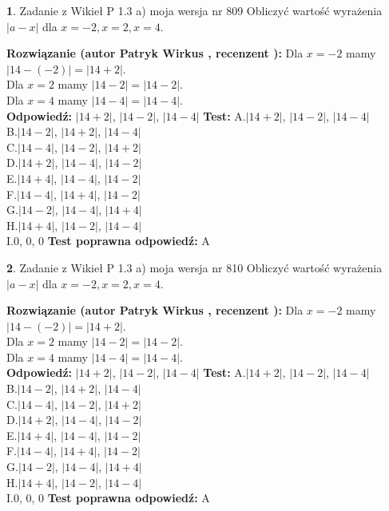 \documentclass[12pt, a4paper]{article}
\theoremstyle{definition} %
\newtheorem{zad}{}
\newcommand{\zadStart}[1]{\begin{zad}#1\newline}
\newcommand{\zadStop}{\end{zad}}
\newcommand{\rozwStart}[2]{\noindent \textbf{Rozwiązanie (autor #1 , recenzent #2): }\newline}
\newcommand{\rozwStop}{\newline}
\newcommand{\odpStart}{\noindent \textbf{Odpowiedź:}\newline}
\newcommand{\odpStop}{\newline}
\newcommand{\testStart}{\noindent \textbf{Test:}\newline}
\newcommand{\testStop}{\newline}
\newcommand{\kluczStart}{\noindent \textbf{Test poprawna odpowiedź:}\newline}
\newcommand{\kluczStop}{\newline}
\begin{document}
\zadStart{Zadanie z Wikieł P 1.3 a) moja wersja nr 809}
Obliczyć wartość wyrażenia $|a - x|$ dla $x=-2,x=2,x=4$.
\zadStop
\rozwStart{Patryk Wirkus}{}
Dla $x = -2$ mamy $|14 - (-2)| = |14 + 2|$.\\
Dla $x = 2$ mamy $|14 - 2| = |14 - 2|$.\\
Dla $x = 4$ mamy $|14 - 4| = |14 - 4|$.\\
\rozwStop
\odpStart
$|14 + 2|$, $|14 - 2|$, $|14 - 4|$
\odpStop
\testStart
A.$|14 + 2|$, $|14 - 2|$, $|14 - 4|$\\
B.$|14 - 2|$, $|14 + 2|$, $|14 - 4|$\\
C.$|14 - 4|$, $|14 - 2|$, $|14 + 2|$\\
D.$|14 + 2|$, $|14 - 4|$, $|14 - 2|$\\
E.$|14 + 4|$, $|14 - 4|$, $|14 - 2|$\\
F.$|14 - 4|$, $|14 + 4|$, $|14 - 2|$\\
G.$|14 - 2|$, $|14 - 4|$, $|14 + 4|$\\
H.$|14 + 4|$, $|14 - 2|$, $|14 - 4|$\\
I.$0$, $0$, $0$
\testStop
\kluczStart
A
\kluczStop



\zadStart{Zadanie z Wikieł P 1.3 a) moja wersja nr 810}
Obliczyć wartość wyrażenia $|a - x|$ dla $x=-2,x=2,x=4$.
\zadStop
\rozwStart{Patryk Wirkus}{}
Dla $x = -2$ mamy $|14 - (-2)| = |14 + 2|$.\\
Dla $x = 2$ mamy $|14 - 2| = |14 - 2|$.\\
Dla $x = 4$ mamy $|14 - 4| = |14 - 4|$.\\
\rozwStop
\odpStart
$|14 + 2|$, $|14 - 2|$, $|14 - 4|$
\odpStop
\testStart
A.$|14 + 2|$, $|14 - 2|$, $|14 - 4|$\\
B.$|14 - 2|$, $|14 + 2|$, $|14 - 4|$\\
C.$|14 - 4|$, $|14 - 2|$, $|14 + 2|$\\
D.$|14 + 2|$, $|14 - 4|$, $|14 - 2|$\\
E.$|14 + 4|$, $|14 - 4|$, $|14 - 2|$\\
F.$|14 - 4|$, $|14 + 4|$, $|14 - 2|$\\
G.$|14 - 2|$, $|14 - 4|$, $|14 + 4|$\\
H.$|14 + 4|$, $|14 - 2|$, $|14 - 4|$\\
I.$0$, $0$, $0$
\testStop
\kluczStart
A
\kluczStop
\end{document}
